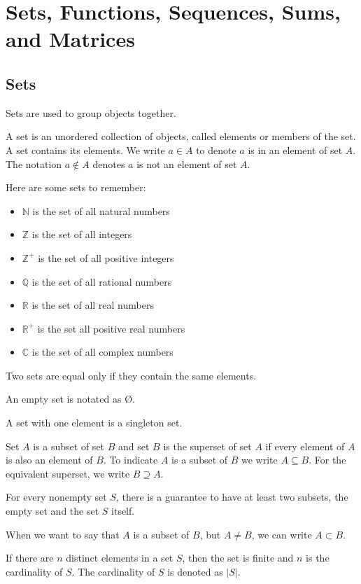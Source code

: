\documentclass[../discrete.tex]{subfiles}
\begin{document}
\chapter{Sets, Functions, Sequences, Sums, and Matrices}
\section{Sets}
Sets are used to group objects together. 

A set is an unordered collection of objects, called elements or members of the set. A set contains 
its elements. We write $a \in A$ to denote $a$ is in an element of set $A$. The notation $a\notin A$ 
denotes $a$ is not an element of set $A$.

Here are some sets to remember:
\begin{itemize}
    \item $\mathbb N$ is the set of all natural numbers
    \item $\mathbb Z$ is the set of all integers
    \item $\mathbb Z^+$ is the set of all positive integers
    \item $\mathbb Q$ is the set of all rational numbers
    \item $\mathbb R$ is the set of all real numbers
    \item $\mathbb R^+$ is the set all positive real numbers
    \item $\mathbb C$ is the set of all complex numbers
\end{itemize}

Two sets are equal only if they contain the same elements.

An empty set is notated as \O.

A set with one element is a singleton set.

Set $A$ is a subset of set $B$ and set $B$ is the superset of set $A$ if every element of $A$ is 
also an element of $B$. To indicate $A$ is a subset of $B$ we write $A\subseteq B$. For the equivalent 
superset, we write $B\supseteq A$.

For every nonempty set $S$, there is a guarantee to have at least two subsets, the empty set and the set $S$ itself. 

When we want to say that $A$ is a subset of $B$, but $A\neq B$, we can write $A\subset B$. 

If there are $n$ distinct elements in a set $S$, then the set is finite and $n$ is the cardinality of $S$. 
The cardinality of $S$ is denoted as $|S|$.
\end{document}
